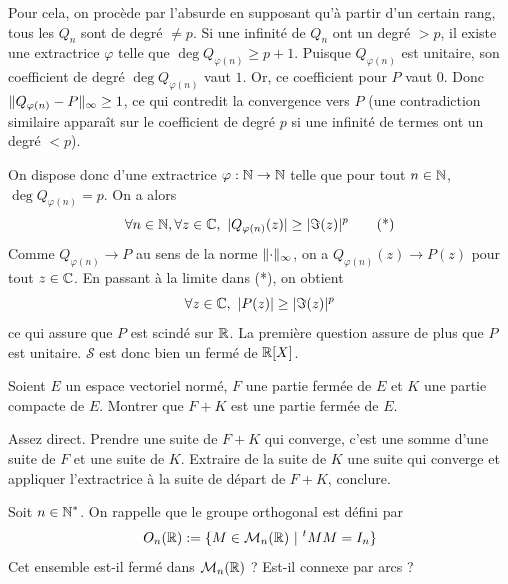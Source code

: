 \begin{solution}
\begin{enumerate}
        Pour cela, on procède par l'absurde en supposant qu'à partir d'un certain rang, tous les $Q_n$ sont de degré $\neq p$.
        Si une infinité de $Q_n$ ont un degré $> p$, il existe une extractrice $\varphi$ telle que $\deg Q_{\varphi(n)} \ge p+1$. 
        Puisque $Q_{\varphi(n)}$ est unitaire, son coefficient de degré $\deg Q_{\varphi(n)}$ vaut $1$. Or, ce coefficient pour $P$ vaut $0$.
        Donc $\lVert Q_{\varphi(n)} - P\rVert_\infty \ge 1$, ce qui contredit la convergence vers $P$ (une contradiction similaire apparaît sur le coefficient de degré $p$ si une infinité de termes ont un degré $< p$).
        
        On dispose donc d'une extractrice $\varphi:\operatorname{\mathbb N}\to\operatorname{\mathbb N}$ telle que pour tout $n\in\operatorname{\mathbb N}$, $\deg Q_{\varphi(n)}=p$.
        On a alors 
        \[
            \forall n\in\N,\forall z\in\C,\ |Q_{\varphi(n)}(z)|\geq|\Im(z)|^p    \tag*{(*)}
        \]
        Comme $Q_{\varphi(n)} \to P$ au sens de la norme $\lVert\cdot\rVert_\infty$, on a $Q_{\varphi(n)}(z) \to P(z)$ pour tout $z \in \operatorname{\mathbb C}$. 
        En passant à la limite dans (*), on obtient
        \[
            \forall z\in\operatorname{\mathbb C},\ |P(z)|\geq|\Im(z)|^p
        \]
        ce qui assure que $P$ est scindé sur $\operatorname{\mathbb R}$. La première question assure de plus que $P$ est unitaire. $\mathcal S$ est donc bien un fermé de $\operatorname{\mathbb R}[X]$.
    \end{enumerate}
\end{solution}

\begin{exo}
    \label{evn4}
	Soient $E$ un espace vectoriel normé, $F$ une partie fermée de $E$ et $K$ une partie compacte de $E$. Montrer que $F+K$ est une partie fermée de $E$.
\end{exo}

\begin{solution}
    Assez direct. Prendre une suite de $F+K$ qui converge, c'est une somme d'une suite de $F$ et une suite de $K$. 
    Extraire de la suite de $K$ une suite qui converge et appliquer l'extractrice à la suite de départ de $F+K$, conclure.
\end{solution}

\begin{exo}
    \label{evn5}
	Soit $n\in\operatorname{\mathbb N}^*$. On rappelle que le groupe orthogonal est défini par \[O_n(\operatorname{\mathbb R}):=\lbrace M\in\mathcal M_n(\operatorname{\mathbb R})\ |\ {}^tMM=I_n\rbrace\]
	Cet ensemble est-il fermé dans $\mathcal M_n(\operatorname{\mathbb R})$ ? Est-il connexe par arcs ?
\end{exo}

